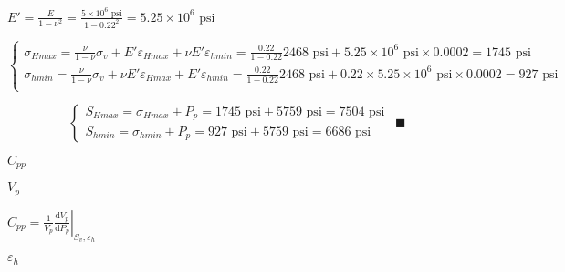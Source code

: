 \documentclass[onecolumn,11pt]{report}
\def\lthtmlcheckvsize{\ifdim\ht\sizebox<\vsize 
  \ifdim\wd\sizebox<\hsize\expandafter\hfill\fi \expandafter\vfill
  \else\expandafter\vss\fi}%
\begin{document}
{\newpage\clearpage
{}%
$\displaystyle E' = \frac{E}{1-\nu^2} = \frac{5 \times 10^6 \text{ psi}}{1-0.22^2} = 5.25 \times 10^6 \text{ psi}
$%
\lthtmlindisplaymathZ
\lthtmlcheckvsize\clearpage}

{\newpage\clearpage
{}%
\begin{displaymath}\left\lbrace
\begin{array}{l}
\sigma_{Hmax} =  \frac{\nu}{1-\nu} \sigma_{v} +
E' \varepsilon_{Hmax} +
\nu E'\varepsilon_{hmin} =
\frac{0.22}{1-0.22} 2468 \text{ psi} +
5.25 \times 10^6 \text{ psi} \times 0.0002 = 1745 \text{ psi}\\
\sigma_{hmin} =  \frac{\nu}{1-\nu} \sigma_{v} +
\nu E' \varepsilon_{Hmax} +
E' \varepsilon_{hmin} =
\frac{0.22}{1-0.22} 2468 \text{ psi} +
0.22 \times 5.25 \times 10^6 \text{ psi} \times 0.0002 = 927 \text{ psi}  \\
\end{array}
\right.\end{displaymath}%
\lthtmldisplayZ
\lthtmlcheckvsize\clearpage}

{\newpage\clearpage
{}%
\begin{displaymath}\left\lbrace
\begin{array}{l}
S_{Hmax} = \sigma_{Hmax} + P_p =  1745 \text{ psi} + 5759 \text{ psi} = 7504 \text{ psi}\\
S_{hmin} = \sigma_{hmin} + P_p =  927 \text{ psi} + 5759 \text{ psi} = 6686 \text{ psi}
\end{array}
\right. \: \: \blacksquare\end{displaymath}%
\lthtmldisplayZ
\lthtmlcheckvsize\clearpage}

{\newpage\clearpage
{}%
$ C_{pp}$%
\lthtmlindisplaymathZ
\lthtmlcheckvsize\clearpage}

{\newpage\clearpage
{}%
$ V_p$%
\lthtmlindisplaymathZ
\lthtmlcheckvsize\clearpage}

{\newpage\clearpage
{}%
$\displaystyle C_{pp} = \left. \frac{1}{V_p} \frac{\mathrm{d}V_p}{\mathrm{d}P_p} \right|_{S_v,\varepsilon_h}$%
\lthtmlindisplaymathZ
\lthtmlcheckvsize\clearpage}

{\newpage\clearpage
{}%
$ \varepsilon_h$%
\lthtmlindisplaymathZ
\lthtmlcheckvsize\clearpage}
\end{document}
